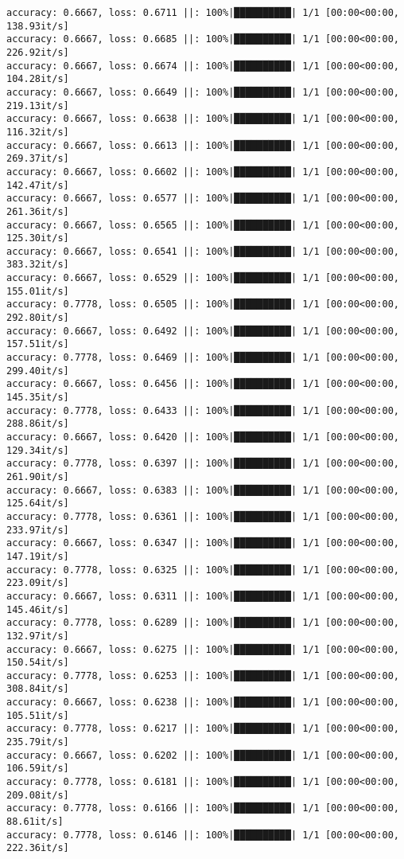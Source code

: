 \documentclass[
]{article}
\begin{document}
\begin{verbatim}
accuracy: 0.6667, loss: 0.6711 ||: 100%|██████████| 1/1 [00:00<00:00, 138.93it/s]
accuracy: 0.6667, loss: 0.6685 ||: 100%|██████████| 1/1 [00:00<00:00, 226.92it/s]
accuracy: 0.6667, loss: 0.6674 ||: 100%|██████████| 1/1 [00:00<00:00, 104.28it/s]
accuracy: 0.6667, loss: 0.6649 ||: 100%|██████████| 1/1 [00:00<00:00, 219.13it/s]
accuracy: 0.6667, loss: 0.6638 ||: 100%|██████████| 1/1 [00:00<00:00, 116.32it/s]
accuracy: 0.6667, loss: 0.6613 ||: 100%|██████████| 1/1 [00:00<00:00, 269.37it/s]
accuracy: 0.6667, loss: 0.6602 ||: 100%|██████████| 1/1 [00:00<00:00, 142.47it/s]
accuracy: 0.6667, loss: 0.6577 ||: 100%|██████████| 1/1 [00:00<00:00, 261.36it/s]
accuracy: 0.6667, loss: 0.6565 ||: 100%|██████████| 1/1 [00:00<00:00, 125.30it/s]
accuracy: 0.6667, loss: 0.6541 ||: 100%|██████████| 1/1 [00:00<00:00, 383.32it/s]
accuracy: 0.6667, loss: 0.6529 ||: 100%|██████████| 1/1 [00:00<00:00, 155.01it/s]
accuracy: 0.7778, loss: 0.6505 ||: 100%|██████████| 1/1 [00:00<00:00, 292.80it/s]
accuracy: 0.6667, loss: 0.6492 ||: 100%|██████████| 1/1 [00:00<00:00, 157.51it/s]
accuracy: 0.7778, loss: 0.6469 ||: 100%|██████████| 1/1 [00:00<00:00, 299.40it/s]
accuracy: 0.6667, loss: 0.6456 ||: 100%|██████████| 1/1 [00:00<00:00, 145.35it/s]
accuracy: 0.7778, loss: 0.6433 ||: 100%|██████████| 1/1 [00:00<00:00, 288.86it/s]
accuracy: 0.6667, loss: 0.6420 ||: 100%|██████████| 1/1 [00:00<00:00, 129.34it/s]
accuracy: 0.7778, loss: 0.6397 ||: 100%|██████████| 1/1 [00:00<00:00, 261.90it/s]
accuracy: 0.6667, loss: 0.6383 ||: 100%|██████████| 1/1 [00:00<00:00, 125.64it/s]
accuracy: 0.7778, loss: 0.6361 ||: 100%|██████████| 1/1 [00:00<00:00, 233.97it/s]
accuracy: 0.6667, loss: 0.6347 ||: 100%|██████████| 1/1 [00:00<00:00, 147.19it/s]
accuracy: 0.7778, loss: 0.6325 ||: 100%|██████████| 1/1 [00:00<00:00, 223.09it/s]
accuracy: 0.6667, loss: 0.6311 ||: 100%|██████████| 1/1 [00:00<00:00, 145.46it/s]
accuracy: 0.7778, loss: 0.6289 ||: 100%|██████████| 1/1 [00:00<00:00, 132.97it/s]
accuracy: 0.6667, loss: 0.6275 ||: 100%|██████████| 1/1 [00:00<00:00, 150.54it/s]
accuracy: 0.7778, loss: 0.6253 ||: 100%|██████████| 1/1 [00:00<00:00, 308.84it/s]
accuracy: 0.6667, loss: 0.6238 ||: 100%|██████████| 1/1 [00:00<00:00, 105.51it/s]
accuracy: 0.7778, loss: 0.6217 ||: 100%|██████████| 1/1 [00:00<00:00, 235.79it/s]
accuracy: 0.6667, loss: 0.6202 ||: 100%|██████████| 1/1 [00:00<00:00, 106.59it/s]
accuracy: 0.7778, loss: 0.6181 ||: 100%|██████████| 1/1 [00:00<00:00, 209.08it/s]
accuracy: 0.7778, loss: 0.6166 ||: 100%|██████████| 1/1 [00:00<00:00, 88.61it/s]
accuracy: 0.7778, loss: 0.6146 ||: 100%|██████████| 1/1 [00:00<00:00, 222.36it/s]

\end{verbatim}
\end{document}
